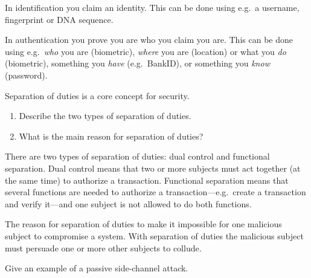 \begin{frame}
  \begin{solution}
    In identification you claim an identity.
    This can be done using e.g.~a username, fingerprint or DNA sequence.

    In authentication you prove you are who you claim you are.
    This can be done using e.g.~\emph{who} you are (biometric), \emph{where} 
    you are (location) or what you \emph{do} (biometric), something you 
    \emph{have} (e.g.~BankID), or something you \emph{know} (password).
  \end{solution}
\end{frame}


\begin{frame}
  \begin{exercise}
    Separation of duties is a core concept for security.
    \begin{enumerate}
      \item Describe the two types of separation of duties.
      \item What is the main reason for separation of duties?
    \end{enumerate}
  \end{exercise}
\end{frame}

\begin{frame}
  \begin{solution}
    There are two types of separation of duties:
    dual control and functional separation.
    Dual control means that two or more subjects must act together (at the same 
    time) to authorize a transaction.
    Functional separation means that several functions are needed to authorize 
    a transaction---e.g.~create a transaction and verify it---and one subject 
    is not allowed to do both functions.

    The reason for separation of duties to make it impossible for one malicious 
    subject to compromise a system.
    With separation of duties the malicious subject must persuade one or more 
    other subjects to collude.
  \end{solution}
\end{frame}

  
\begin{frame}
  \begin{exercise}
    Give an example of a passive side-channel attack.
  \end{exercise}
\end{frame}

